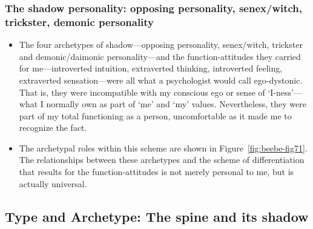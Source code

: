 \subsubsection{The shadow personality: opposing personality, senex/witch, trickster, demonic personality}

\begin{itemize}

\item
The four archetypes of shadow—opposing personality, senex/witch, trickster and
demonic/daimonic personality—and the function-attitudes they carried for
me—introverted intuition, extraverted thinking, introverted feeling,
extraverted sensation—were all what a psychologist would call ego-dystonic.
That is, they were incompatible with my conscious ego or sense of ‘I-ness’—
what I normally own as part of ‘me’ and ‘my’ values. Nevertheless, they were
part of my total functioning as a person, uncomfortable as it made me to
recognize the fact.

\item The archetypal roles within this scheme are shown in
Figure~\ref{fig:beebe-fig71}.  The relationships between these archetypes and
the scheme of differentiation that results for the function-attitudes is not
merely personal to me, but is actually universal.

\end{itemize}




\subsection{Type and Archetype: The spine and its shadow}

